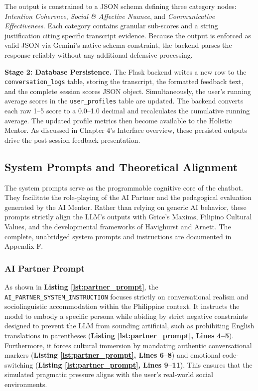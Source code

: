 The output is constrained to a JSON schema defining three category nodes: \textit{Intention Coherence}, \textit{Social \& Affective Nuance}, and \textit{Communicative Effectiveness}. Each category contains granular sub-scores and a string justification citing specific transcript evidence. Because the output is enforced as valid JSON via Gemini's native schema constraint, the backend parses the response reliably without any additional defensive processing.
 
\textbf{Stage 2: Database Persistence.} The Flask backend writes a new row to the \texttt{conversation\_logs} table, storing the transcript, the formatted feedback text, and the complete session scores JSON object. Simultaneously, the user's running average scores in the \texttt{user\_profiles} table are updated. The backend converts each raw 1--5 score to a 0.0--1.0 decimal and recalculates the cumulative running average. The updated profile metrics then become available to the Holistic Mentor. As discussed in Chapter 4's Interface overview, these persisted outputs drive the post-session feedback presentation.

\subsection{System Prompts and Theoretical Alignment}

The system prompts serve as the programmable cognitive core of the chatbot. They facilitate the role-playing of the AI Partner and the pedagogical evaluation generated by the AI Mentor. Rather than relying on generic AI behavior, these prompts strictly align the LLM's outputs with Grice's Maxims, Filipino Cultural Values, and the developmental frameworks of Havighurst and Arnett. The complete, unabridged system prompts and instructions are documented in Appendix F.

\subsubsection*{AI Partner Prompt}
As shown in \textbf{Listing \ref{lst:partner_prompt}}, the \texttt{AI\_PARTNER\_SYSTEM\_INSTRUCTION} focuses strictly on conversational realism and sociolinguistic accommodation within the Philippine context. It instructs the model to embody a specific persona while abiding by strict negative constraints designed to prevent the LLM from sounding artificial, such as prohibiting English translations in parentheses (\textbf{Listing \ref{lst:partner_prompt}, Lines 4--5}). Furthermore, it forces cultural immersion by mandating authentic conversational markers (\textbf{Listing \ref{lst:partner_prompt}, Lines 6--8}) and emotional code-switching (\textbf{Listing \ref{lst:partner_prompt}, Lines 9--11}). This ensures that the simulated pragmatic pressure aligns with the user's real-world social environments.

